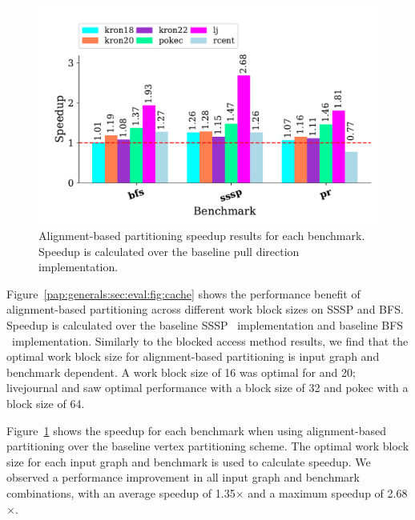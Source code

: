 \begin{figure}[h!]
    \centering
    \includegraphics[scale = 0.6]{graphit-figures/align.pdf}
    \caption{Alignment-based partitioning speedup results for each benchmark. Speedup is calculated over the baseline pull direction implementation.} %
    \label{pap:generals:sec:eval:fig:aligned}
\end{figure}
 
Figure~\ref{pap:generals:sec:eval:fig:cache} shows the performance benefit of alignment-based partitioning across different work block sizes on SSSP and BFS.
Speedup is calculated over the baseline SSSP \pull~implementation and baseline BFS \pull~implementation. 
Similarly to the blocked access method results, we find that the optimal work block size for alignment-based partitioning is input graph and benchmark dependent. 
A work block size of 16 was optimal for  and 20; livejournal and  saw optimal performance with a block size of 32 and pokec with a block size of 64.

Figure~\ref{pap:generals:sec:eval:fig:aligned} shows the speedup for each benchmark when using alignment-based partitioning over the baseline vertex partitioning scheme. 
The optimal work block size for each input graph and benchmark is used to calculate speedup. 
We observed a performance improvement in all input graph and benchmark combinations, with an average speedup of 1.35$\times$ and a maximum speedup of 2.68$\times$. 
 
